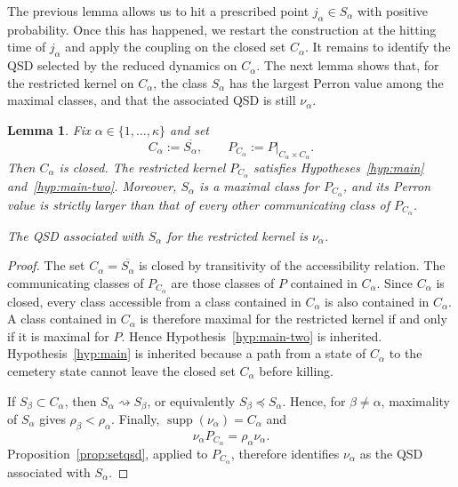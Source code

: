\documentclass[10pt,letterpaper]{article}
\theoremstyle{compactplain}
\newtheorem{lemma}[theorem]{Lemma}
\theoremstyle{compactdefinition}
\DeclareMathOperator{\supp}{supp}
\newcommand{\1}{\mathds{1}}
\begin{document}
The previous lemma allows us to hit a prescribed point
\(j_\alpha\in S_\alpha\) with positive probability. Once this has happened, we
restart the construction at the hitting time of \(j_\alpha\) and apply the
coupling on the closed set \(C_\alpha\). It remains to identify the QSD selected
by the reduced dynamics on \(C_\alpha\). The next lemma shows that, for the
restricted kernel on \(C_\alpha\), the class \(S_\alpha\) has the largest
Perron value among the maximal classes, and that the associated QSD is still
\(\nu_\alpha\).

\begin{lemma}
\label{lem:Calpha-top}
Fix \(\alpha\in\{1,\ldots,\kappa\}\) and set
\[
C_\alpha:=\overline{S_\alpha},
\qquad
P_{C_\alpha}:=P|_{C_\alpha\times C_\alpha}.
\]
Then \(C_\alpha\) is closed. The restricted kernel \(P_{C_\alpha}\) satisfies
Hypotheses~\ref{hyp:main} and~\ref{hyp:main-two}. Moreover, \(S_\alpha\) is a maximal class for \(P_{C_\alpha}\), and its Perron value is strictly larger than that of every other communicating class of \(P_{C_\alpha}\).

The QSD associated with \(S_\alpha\) for the restricted kernel is \(\nu_\alpha\).
\end{lemma}

\begin{proof}
The set \(C_\alpha=\overline{S_\alpha}\) is closed by transitivity of the accessibility relation. The communicating classes of \(P_{C_\alpha}\) are those classes of \(P\)
contained in \(C_\alpha\). Since \(C_\alpha\) is closed, every class accessible from a class contained in
\(C_\alpha\) is also contained in \(C_\alpha\). A class contained in
\(C_\alpha\) is therefore maximal for the restricted kernel if and only if it
is maximal for \(P\). Hence Hypothesis~\ref{hyp:main-two} is inherited.
Hypothesis~\ref{hyp:main} is inherited because a path from a state of
\(C_\alpha\) to the cemetery state cannot leave the closed set
\(C_\alpha\) before killing.


If \(S_\beta\subset C_\alpha\), then
\(S_\alpha\rightsquigarrow S_\beta\), or equivalently
\(S_\beta\preccurlyeq S_\alpha\). Hence, for
\(\beta\neq\alpha\), maximality of \(S_\alpha\) gives
\(\rho_\beta<\rho_\alpha\). Finally,
\(\supp(\nu_\alpha)=C_\alpha\) and
\[
\nu_\alpha P_{C_\alpha}
=
\rho_\alpha\nu_\alpha.
\]
Proposition~\ref{prop:setqsd}, applied to \(P_{C_\alpha}\), therefore
identifies \(\nu_\alpha\) as the QSD associated with \(S_\alpha\).
\end{proof}
\end{document}
